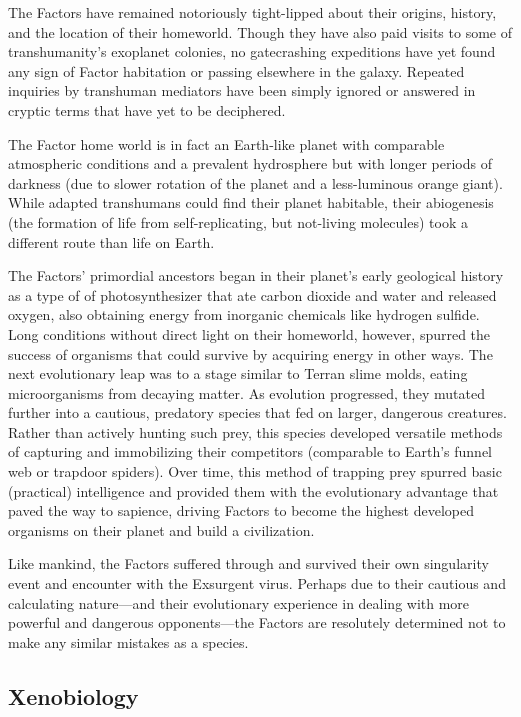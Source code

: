 The Factors have remained notoriously tight-lipped about their origins, history, and the location of their homeworld. Though they have also paid visits to some of transhumanity's exoplanet colonies, no gatecrashing expeditions have yet found any sign of Factor habitation or passing elsewhere in the galaxy. Repeated inquiries by transhuman mediators have been simply ignored or answered in cryptic terms that have yet to be deciphered. 

The Factor home world is in fact an Earth-like planet with comparable atmospheric conditions and a prevalent hydrosphere but with longer periods of darkness (due to slower rotation of the planet and a less-luminous orange giant). While adapted transhumans could find their planet habitable, their abiogenesis (the formation of life from self-replicating, but not-living molecules) took a different route than life on Earth. 

The Factors' primordial ancestors began in their planet's early geological history as a type of of photosynthesizer that ate carbon dioxide and water and released oxygen, also obtaining energy from inorganic chemicals like hydrogen sulfide. Long conditions without direct light on their homeworld, however, spurred the success of organisms that could survive by acquiring energy in other ways. The next evolutionary leap was to a stage similar to Terran slime molds, eating microorganisms from decaying matter. As evolution progressed, they mutated further into a cautious, predatory species that fed on larger, dangerous creatures. Rather than actively hunting such prey, this species developed versatile methods of capturing and immobilizing their competitors (comparable to Earth's funnel web or trapdoor spiders). Over time, this method of trapping prey spurred basic (practical) intelligence and provided them with the evolutionary advantage that paved the way to sapience, driving Factors to become the highest developed organisms on their planet and build a civilization. 



Like mankind, the Factors suffered through and survived their own singularity event and encounter with the Exsurgent virus. Perhaps due to their cautious and calculating nature—and their evolutionary experience in dealing with more powerful and dangerous opponents—the Factors are resolutely determined not to make any similar mistakes as a species. 

\subsection{Xenobiology } 

